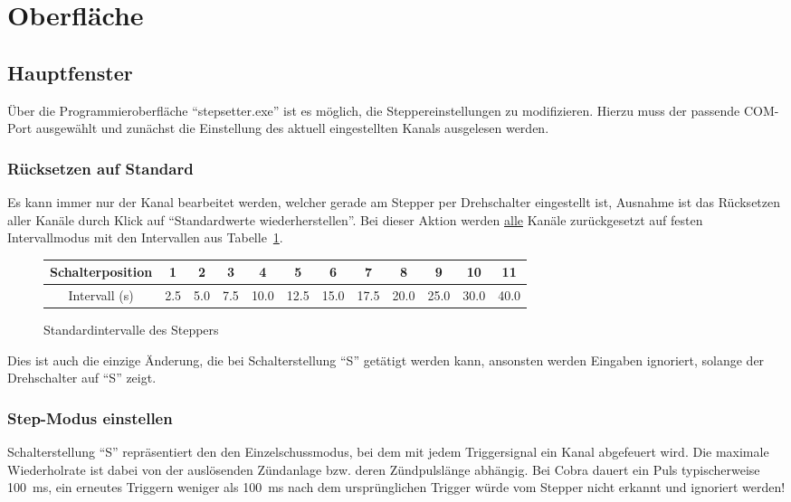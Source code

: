 \documentclass[paper=a4, open=any, numbers=noenddot]{scrbook}
\begin{document}
		\section{Oberfläche}
			\subsection{Hauptfenster}
				Über die Programmieroberfläche \enquote{stepsetter.exe} ist es möglich, die Steppereinstellungen zu modifizieren. Hierzu muss der passende COM-Port ausgewählt und zunächst die Einstellung des aktuell eingestellten Kanals ausgelesen werden.

				\subsubsection*{Rücksetzen auf Standard}
					Es kann immer nur der Kanal bearbeitet werden, welcher gerade am Stepper per Drehschalter eingestellt ist, Ausnahme ist das Rücksetzen aller Kanäle durch Klick auf \enquote{Standardwerte wiederherstellen}. Bei dieser Aktion werden \underline{alle} Kanäle zurückgesetzt auf festen Intervallmodus mit den Intervallen aus Tabelle~\ref{tab:standardintervalle}.

					\begin{figure}
						\begin{center}
							\begin{longtabu} [c]{c|*{11}c}
								Schalterposition & 1   & 2   & 3   & 4    & 5    & 6    & 7    & 8    & 9    & 10   & 11   \\ \hline
								Intervall (s)    & 2.5 & 5.0 & 7.5 & 10.0 & 12.5 & 15.0 & 17.5 & 20.0 & 25.0 & 30.0 & 40.0
							\end{longtabu}
						\end{center}
						\caption{Standardintervalle des Steppers}
						\label{tab:standardintervalle}
					\end{figure}

					Dies ist auch die einzige Änderung, die bei Schalterstellung \enquote{S} getätigt werden kann, ansonsten werden Eingaben ignoriert, solange der Drehschalter auf \enquote{S} zeigt.

				\subsubsection*{Step-Modus einstellen}

					Schalterstellung \enquote{S} repräsentiert den den Einzelschussmodus, bei dem mit jedem Triggersignal ein Kanal abgefeuert wird. Die maximale Wiederholrate ist dabei von der auslösenden Zündanlage bzw. deren Zündpulslänge abhängig. Bei Cobra dauert ein Puls typischerweise \SI{100}{\milli\second}, ein erneutes Triggern weniger als \SI{100}{\milli\second} nach dem ursprünglichen Trigger würde vom Stepper nicht erkannt und ignoriert werden!
\end{document}
